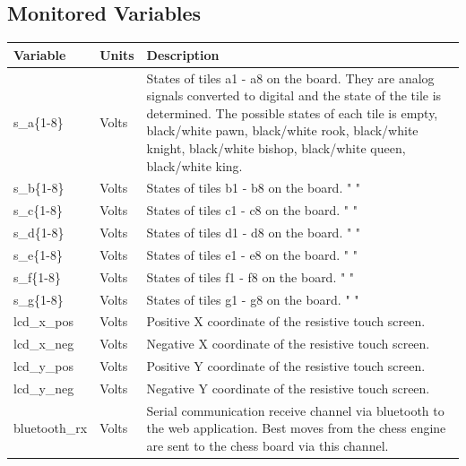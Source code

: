 \documentclass[12pt, titlepage]{article}
\begin{document}
\subsection{Monitored Variables}
\begin{table}[H]
  \centering
      \setlength{\leftmargini}{0.4cm}
      \begin{tabular}{| >{\centering\arraybackslash}m{2.5cm} | 
        >{\centering\arraybackslash}m{2cm} | 
        >{\centering\arraybackslash}m{9cm} |}
      \hline
      \rowcolor[gray]{0.9}
      Variable & Units & Description\\
      \hline
      s\_a\{1-8\} & Volts & States of tiles a1 - a8 on the board. They are analog signals 
      converted to digital and the state of the tile is determined. The possible states of 
      each tile is empty, black/white pawn, black/white rook, black/white knight, 
      black/white bishop, black/white queen, black/white king. \\
      \hline
      s\_b\{1-8\} & Volts & States of tiles b1 - b8 on the board. " " \\
      \hline
      s\_c\{1-8\} & Volts & States of tiles c1 - c8 on the board. " " \\
      \hline
      s\_d\{1-8\} & Volts & States of tiles d1 - d8 on the board. " " \\
      \hline
      s\_e\{1-8\} & Volts & States of tiles e1 - e8 on the board. " " \\
      \hline
      s\_f\{1-8\} & Volts & States of tiles f1 - f8 on the board. " " \\
      \hline
      s\_g\{1-8\} & Volts & States of tiles g1 - g8 on the board. " " \\
      \hline
      lcd\_x\_pos & Volts & Positive X coordinate of the resistive touch screen.\\
      \hline
      lcd\_x\_neg & Volts & Negative X coordinate of the resistive touch screen.\\
      \hline
      lcd\_y\_pos & Volts & Positive Y coordinate of the resistive touch screen.\\
      \hline
      lcd\_y\_neg & Volts & Negative Y coordinate of the resistive touch screen.\\
      \hline
      bluetooth\_rx & Volts & Serial communication receive channel via bluetooth to the web application.
      Best moves from the chess engine are sent to the chess board via this channel. \\
      \hline 
      \end{tabular}
  \label{Table}
  \end{table}
\end{document}

